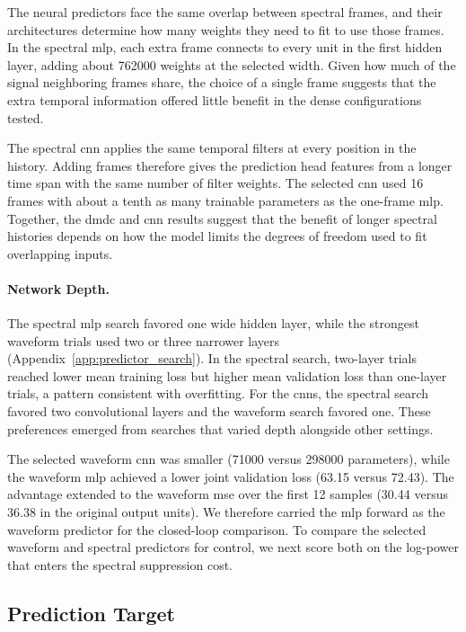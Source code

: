 The neural predictors face the same overlap between spectral frames, and their architectures determine how many weights they need to fit to use those frames.
In the spectral \ac{mlp}, each extra frame connects to every unit in the first hidden layer, adding about \num{762000} weights at the selected width.
Given how much of the signal neighboring frames share, the choice of a single frame suggests that the extra temporal information offered little benefit in the dense configurations tested.

The spectral \ac{cnn} applies the same temporal filters at every position in the history.
Adding frames therefore gives the prediction head features from a longer time span with the same number of filter weights.
The selected \ac{cnn} used 16 frames with about a tenth as many trainable parameters as the one-frame \ac{mlp}.
Together, the \ac{dmdc} and \ac{cnn} results suggest that the benefit of longer spectral histories depends on how the model limits the degrees of freedom used to fit overlapping inputs.

\paragraph*{Network Depth.}
The spectral \ac{mlp} search favored one wide hidden layer, while the strongest waveform trials used two or three narrower layers (Appendix~\ref{app:predictor_search}).
In the spectral search, two-layer trials reached lower mean training loss but higher mean validation loss than one-layer trials, a pattern consistent with overfitting.
For the \acp{cnn}, the spectral search favored two convolutional layers and the waveform search favored one.
These preferences emerged from searches that varied depth alongside other settings.

The selected waveform \ac{cnn} was smaller (\num{71000} versus \num{298000} parameters), while the waveform \ac{mlp} achieved a lower joint validation loss (63.15 versus 72.43).
The advantage extended to the waveform \ac{mse} over the first 12 samples (30.44 versus 36.38 in the original output units).
We therefore carried the \ac{mlp} forward as the waveform predictor for the closed-loop comparison.
To compare the selected waveform and spectral predictors for control, we next score both on the log-power that enters the spectral suppression cost.

\subsection{Prediction Target}\label{sec:offline_prediction_target}

